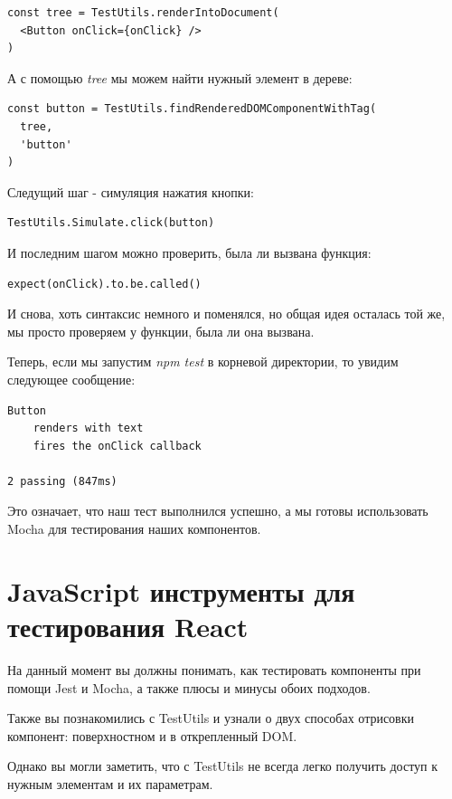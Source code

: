 \begin{lstlisting}
const tree = TestUtils.renderIntoDocument(
  <Button onClick={onClick} />
)
\end{lstlisting}

А с помощью \textit{tree} мы можем найти нужный элемент в дереве:

\begin{lstlisting}
const button = TestUtils.findRenderedDOMComponentWithTag(
  tree,
  'button'
)
\end{lstlisting}

Следущий шаг - симуляция нажатия кнопки:

\begin{lstlisting}
TestUtils.Simulate.click(button)
\end{lstlisting}

И последним шагом можно проверить, была ли вызвана функция:

\begin{lstlisting}
expect(onClick).to.be.called()
\end{lstlisting}

И снова, хоть синтаксис немного и поменялся, но общая идея осталась той же, мы просто проверяем у функции, была ли она вызвана.

Теперь, если мы запустим \textit{npm test} в корневой директории, то увидим следующее сообщение:

\begin{lstlisting}
Button
	renders with text
	fires the onClick callback
	
2 passing (847ms)
\end{lstlisting}

Это означает, что наш тест выполнился успешно, а мы готовы использовать Mocha для тестирования наших компонентов.

\section{JavaScript инструменты для тестирования React}

На данный момент вы должны понимать, как тестировать компоненты при помощи Jest и Mocha, а также плюсы и минусы обоих подходов.

Также вы познакомились с TestUtils и узнали о двух способах отрисовки компонент: поверхностном и в открепленный DOM.

Однако вы могли заметить, что с TestUtils не всегда легко получить доступ к нужным элементам и их параметрам.

